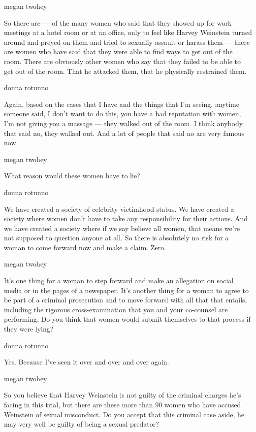 megan twohey

So there are --- of the many women who said that they showed up for work
meetings at a hotel room or at an office, only to feel like Harvey
Weinstein turned around and preyed on them and tried to sexually assault
or harass them --- there are women who have said that they were able to
find ways to get out of the room. There are obviously other women who
say that they failed to be able to get out of the room. That he attacked
them, that he physically restrained them.

donna rotunno

Again, based on the cases that I have and the things that I'm seeing,
anytime someone said, I don't want to do this, you have a bad reputation
with women, I'm not giving you a massage --- they walked out of the
room. I think anybody that said no, they walked out. And a lot of people
that said no are very famous now.

megan twohey

What reason would these women have to lie?

donna rotunno

We have created a society of celebrity victimhood status. We have
created a society where women don't have to take any responsibility for
their actions. And we have created a society where if we say believe all
women, that means we're not supposed to question anyone at all. So there
is absolutely no risk for a woman to come forward now and make a claim.
Zero.

megan twohey

It's one thing for a woman to step forward and make an allegation on
social media or in the pages of a newspaper. It's another thing for a
woman to agree to be part of a criminal prosecution and to move forward
with all that that entails, including the rigorous cross-examination
that you and your co-counsel are performing. Do you think that women
would submit themselves to that process if they were lying?

donna rotunno

Yes. Because I've seen it over and over and over again.

megan twohey

So you believe that Harvey Weinstein is not guilty of the criminal
charges he's facing in this trial, but there are these more than 90
women who have accused Weinstein of sexual misconduct. Do you accept
that this criminal case aside, he may very well be guilty of being a
sexual predator?


